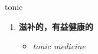 
\begin{frame}
{\huge tonic}
\begin{center}
\begin{enumerate}\Large
  \item \textbf{滋补的，有益健康的}
  \begin{itemize}
    \item \em{\Large{tonic medicine}}
  \end{itemize}
\end{enumerate}
\end{center}
\end{frame}
